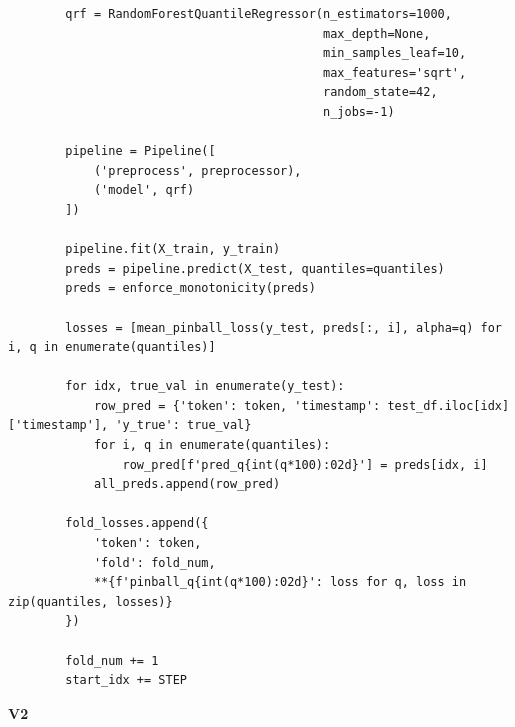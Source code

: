 \documentclass[
  a4paper,
  DIV=11,
  numbers=noendperiod]{scrreprt}
\begin{document}
\begin{verbatim}
        qrf = RandomForestQuantileRegressor(n_estimators=1000,
                                            max_depth=None,
                                            min_samples_leaf=10,
                                            max_features='sqrt',
                                            random_state=42,
                                            n_jobs=-1)

        pipeline = Pipeline([
            ('preprocess', preprocessor),
            ('model', qrf)
        ])

        pipeline.fit(X_train, y_train)
        preds = pipeline.predict(X_test, quantiles=quantiles)
        preds = enforce_monotonicity(preds)

        losses = [mean_pinball_loss(y_test, preds[:, i], alpha=q) for i, q in enumerate(quantiles)]

        for idx, true_val in enumerate(y_test):
            row_pred = {'token': token, 'timestamp': test_df.iloc[idx]['timestamp'], 'y_true': true_val}
            for i, q in enumerate(quantiles):
                row_pred[f'pred_q{int(q*100):02d}'] = preds[idx, i]
            all_preds.append(row_pred)

        fold_losses.append({
            'token': token,
            'fold': fold_num,
            **{f'pinball_q{int(q*100):02d}': loss for q, loss in zip(quantiles, losses)}
        })

        fold_num += 1
        start_idx += STEP
\end{verbatim}

\textbf{V2}
\end{document}
